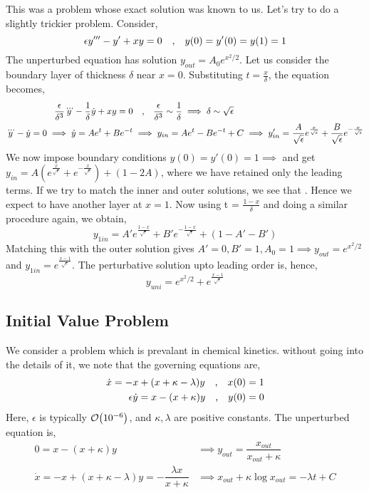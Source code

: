 \documentclass[a4paper,11pt]{article}
\begin{document}
This was a problem whose exact solution was known to us. Let's try to do a slightly trickier problem. Consider,
\begin{equation*}
\epsilon y''' - y' + xy = 0 \qq{,} y(0) = y'(0) = y(1)= 1
\end{equation*}
The unperturbed equation has solution $ y_{out} = A_0 e^{x^2/2} $. Let us consider the boundary layer of thickness $ \delta $ near $ x=0 $. Substituting $ t = \frac{x}{\delta} $, the equation becomes,
\begin{align*}
\dfrac{\epsilon}{\delta^3} \dddot{y} - \dfrac{1}{\delta} \dot{y} + xy = 0 &\qq{,} \dfrac{\epsilon}{\delta^3} \sim \dfrac{1}{\delta} \implies \delta \sim \sqrt{\epsilon} \\
\dddot{y} - \dot{y} = 0 \implies \dot{y} = A e^t + B e^{-t} &\implies y_{in} = A e^t - B e^{-t} + C \implies y_{in}' = \dfrac{A}{\sqrt{\epsilon}} e^{\frac{x}{\sqrt{\epsilon}}} + \dfrac{B}{\sqrt{\epsilon}} e^{-\frac{x}{\sqrt{\epsilon}}}
\end{align*}
We now impose boundary conditions $ y(0)= y'(0) = 1 \implies  $ and get $ y_{in}  = A (e^\frac{x}{\sqrt{\epsilon}} + e^{-\frac{x}{\sqrt{\epsilon}}}) + (1- 2A )$, where we have retained only the leading terms. If we try to match the inner and outer solutions, we see that . Hence we expect to have another layer at $ x=1 $. Now using t = $\frac{1-x}{\delta}$ and doing a similar procedure again, we obtain,
\begin{equation*}
y_{1in} = A' e^{\frac{1-x}{\sqrt{\epsilon}}} + B' e^{-\frac{1-x}{\sqrt{\epsilon}}} + (1 - A' - B')
\end{equation*}
Matching this with the outer solution gives $ A'=0, B'=1, A_0 = 1  \implies y_{out} = e^{x^2/2} $ and $ y_{1in} = e^{\frac{x-1}{\sqrt
\epsilon}} $. The perturbative solution upto leading order is, hence,
\begin{equation*}
y_{uni} = e^{x^2/2} + e^{\frac{x-1}{\sqrt{\epsilon}}}
\end{equation*}






\subsection{Initial Value Problem}
We consider a problem which is prevalant in chemical kinetics. without going into the details of it, we note that the governing equations are,
\begin{align*}
\dot{x}=-x + (x + \kappa - \lambda )y \qq{,} x(0)=1\\
\epsilon \dot{y} = x - (x + \kappa )y \qq{,} y(0)=0
\end{align*}
Here, $ \epsilon $ is typically $ \order{10^{-6}} $, and $ \kappa, \lambda $ are positive constants. The unperturbed equation is,
\begin{align*}
0 = x - (x + \kappa )y  &\implies y_{out} = \dfrac{x_{out}}{x_{out}+ \kappa}\\
\dot{x}=-x + (x + \kappa - \lambda )y = -\dfrac{\lambda x}{x + \kappa} &\implies x_{out} + \kappa \log x_{out} = - \lambda t + C 
\end{align*}
\end{document}
